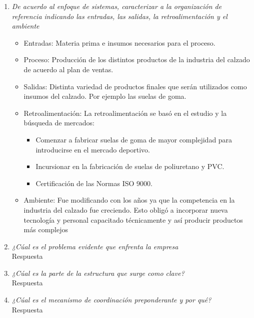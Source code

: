 \documentclass[a4paper,10pt]{article}
\begin{document}
	\begin{enumerate}
		
			\item \textit{ De acuerdo al enfoque de sistemas, caracterizar a la organización de referencia indicando las entradas, las salidas, la retroalimentación y el ambiente}\\
			
			
			\begin{itemize}
			\item Entradas:
			Materia prima e insumos necesarios para el proceso.
			\item Proceso:
			Producción de los distintos productos de la industria del calzado de acuerdo al plan de ventas.
			\item Salidas:
			Distinta variedad de productos finales que serán utilizados como insumos del calzado. Por ejemplo las suelas de goma.
			\item Retroalimentación:
			La retroalimentación se basó en el estudio y la búsqueda de mercados:
			\begin{itemize}
		
		
			\item Comenzar a fabricar suelas de goma de mayor complejidad para introducirse en el mercado deportivo.
			\item 	Incursionar en la fabricación de suelas de poliuretano y PVC.
			\item Certificación de las Normas ISO 9000.
			\end{itemize}
			\item Ambiente:
			Fue modificando con los años ya que la competencia en la industria del calzado fue creciendo. Esto obligó a incorporar nueva tecnología y personal capacitado técnicamente y así producir productos más complejos
			
			\end{itemize}		
			
			\item \textit{¿Cúal es el problema evidente que enfrenta la empresa}\\
			Respuesta			
			
			\item \textit{¿Cúal es la parte de la estructura que surge como clave?}\\
			Respuesta
			
			\item \textit{¿Cúal es el mecanismo de coordinación preponderante y por qué?}\\
			Respuesta
						

\end{enumerate}
\end{document}
